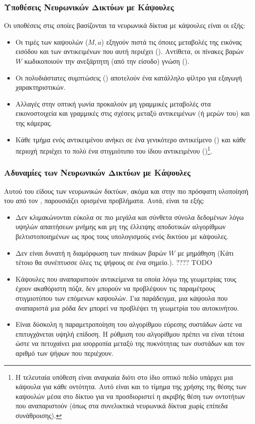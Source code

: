 \subsubsection{Υποθέσεις Νευρωνικών Δικτύων με Κάψουλες}
\label{sec:core_assumptions}
Οι υποθέσεις στις οποίες βασίζονται τα νευρωνικά δίκτυα με κάψουλες είναι οι εξής:
\begin{itemize}
  \item Οι τιμές των καψουλών ($M,a$) εξηγούν πιστά τις όποιες μεταβολές της εικόνας εισόδου και των αντικειμένων που αυτή περιέχει (). Αντίθετα, οι πίνακες βαρών $W$ κωδικοποιούν την ανεξάρτητη (από την είσοδο) γνώση ().
  \item Οι πολυδιάστατες συμπτώσεις () αποτελούν ένα κατάλληλο φίλτρο για εξαγωγή χαρακτηριστικών.
  \item Αλλαγές στην οπτική γωνία προκαλούν μη γραμμικές μεταβολές στα εικονοστοιχεία και γραμμικές στις σχέσεις μεταξύ αντικειμένων (ή μερών του) και της κάμερας.
  \item Κάθε τμήμα ενός αντικειμένου ανήκει σε ένα γενικότερο αντικείμενο () και κάθε περιοχή περιέχει το πολύ ένα στιγμιότυπο του ίδιου αντικειμένου ()\footnote{Η τελευταία υπόθεση είναι αναγκαία διότι στο ίδιο οπτικό πεδίο υπάρχει μια κάψουλα για κάθε οντότητα. Αυτό είναι και το τίμημα της χρήσης της θέσης των καψουλών μέσα στο δίκτυο για να προσδιοριστεί η ακριβής θέση των οντοτήτων που αναπαριστούν (όπως στα συνελικτικά νευρωνικά δίκτυα χωρίς επίπεδα συνάθροισης).}.
\end{itemize}

\subsubsection{Αδυναμίες των Νευρωνικών Δικτύων με Κάψουλες}
Αυτού του είδους των νευρωνικών δικτύων, ακόμα και στην πιο πρόσφατη υλοποίησή του από τον , παρουσιάζει ορισμένα προβλήματα. Αυτά, είναι τα εξής:
\begin{itemize}
  \item Δεν κλιμακώνονται εύκολα σε πιο μεγάλα και σύνθετα σύνολα δεδομένων λόγω υψηλών απαιτήσεων μνήμης και μη της έλλειψης αποδοτικών αλγορίθμων βελτιστοποιημένων ως προς τους υπολογισμούς ενός δικτύου με κάψουλες.
  \item Δεν είναι δυνατή η διαμόρφωση των πινάκων βαρών $W$ με μη μάθηση (Κάτι τέτοιο θα συνέπτυσσε όλες τις ψήφους σε ένα σημείο.). ???? TODO
  \item Κάψουλες που αναπαριστούν αντικείμενα τα οποία λόγω της γεωμετρίας τους έχουν ακαθόριστη πόζα, δεν μπορούν να προβλέψουν τις παραμέτρους στιγμιοτύπου των επόμενων καψουλών. Για παράδειγμα, μια κάψουλα που αναπαριστά μια ρόδα δεν μπορεί να προβλέψει τη γεωμετρία του αυτοκινήτου.
  \item Είναι δύσκολη η παραμετροποίηση του αλγορίθμου εύρεσης συστάδων ώστε να επιτυγχάνεται υψηλή επίδοση. Η ρύθμιση του αλγορίθμου πρέπει να είναι τέτοια ώστε να πετυχαίνει μια ισορροπία μεταξύ της πυκνότητας των συστάδων και τον αριθμό των ψήφων που περιέχουν. 
\end{itemize}


